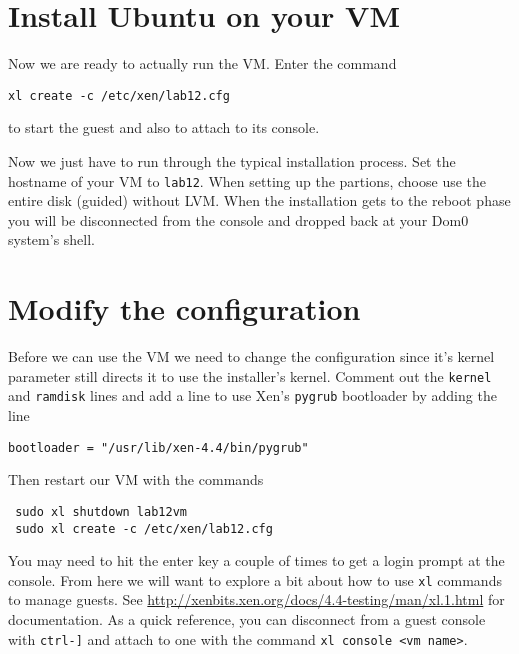 \documentclass{article}
\begin{document}
 \section{Install Ubuntu on your VM}
 Now we are ready to actually run the VM. Enter the command
 
 \texttt{xl create -c /etc/xen/lab12.cfg}
 
 to start the guest and also to attach to its console.
 
 Now we just have to run through the typical installation process. Set the hostname of your VM to \texttt{lab12}. When setting up the partions,
 choose use the entire disk (guided) without LVM. When the installation gets to the reboot phase you will be disconnected from the console and dropped back at your 
 Dom0 system's shell.
 
 \section{Modify the configuration}
 Before we can use the VM we need to change the configuration since it's kernel parameter still directs it to use the installer's kernel. Comment out the \texttt{kernel} and \texttt{ramdisk} lines and add a line to use Xen's \texttt{pygrub} bootloader by adding the line
 
 \texttt{bootloader = "/usr/lib/xen-4.4/bin/pygrub"}
 
 Then restart our VM with the commands
 
 \begin{verbatim}
 sudo xl shutdown lab12vm
 sudo xl create -c /etc/xen/lab12.cfg
 \end{verbatim}
 
 You may need to hit the enter key a couple of times to get a login prompt at the console. From here we will want to explore a bit about how to use \texttt{xl} commands to manage guests. See \url{http://xenbits.xen.org/docs/4.4-testing/man/xl.1.html} for documentation. As a quick reference, you can disconnect from a guest console with \texttt{ctrl-]} and attach to one with the command \texttt{xl console <vm name>}.
 
 
 
\end{document}
